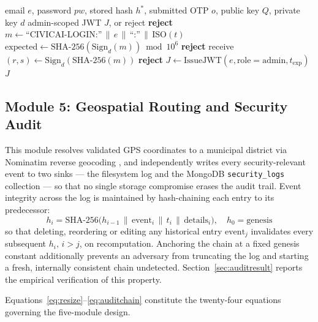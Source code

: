 \documentclass[conference]{IEEEtran}
\begin{document}
\begin{algorithm}[t]
\caption{Three-Factor Administrator Authentication}
\label{alg:auth}
\begin{algorithmic}[1]
\Require email $e$, password $pw$, stored hash $h^{*}$, submitted OTP $o$, public key $Q$, private key $d$
\Ensure admin-scoped JWT $J$, or reject
    \State \textbf{reject} 
\EndIf
\State $m \gets \text{``CIVICAI-LOGIN:''} \,\|\, e \,\|\, \text{``:''} \,\|\, \mathrm{ISO}(t)$
\State $\mathrm{expected} \gets \mathrm{SHA\text{-}256}(\mathrm{Sign}_d(m)) \bmod 10^{6}$ 
    \State \textbf{reject}
\EndIf
\State receive $(r,s) \gets \mathrm{Sign}_d(\mathrm{SHA\text{-}256}(m))$
 
    \State \textbf{reject}
\EndIf
\State $J \gets \mathrm{IssueJWT}(e, \text{role}=\text{admin}, t_{\mathrm{exp}})$ 
\State \Return $J$
\end{algorithmic}
\end{algorithm}

\subsection{Module 5: Geospatial Routing and Security Audit}
This module resolves validated GPS coordinates to a municipal district via Nominatim reverse geocoding \cite{haklay2008osm}, and independently writes every security-relevant event to two sinks --- the filesystem log and the MongoDB \texttt{security\_logs} collection --- so that no single storage compromise erases the audit trail. Event integrity across the log is maintained by hash-chaining each entry to its predecessor:
\begin{equation}
h_i = \mathrm{SHA\text{-}256}\big(h_{i-1} \,\|\, \mathrm{event}_i \,\|\, t_i \,\|\, \mathrm{details}_i\big),\quad h_0 = \mathrm{genesis}
\label{eq:auditchain}
\end{equation}
so that deleting, reordering or editing any historical entry $\mathrm{event}_j$ invalidates every subsequent $h_i,\, i>j$, on recomputation. Anchoring the chain at a fixed genesis constant additionally prevents an adversary from truncating the log and starting a fresh, internally consistent chain undetected. Section~\ref{sec:auditresult} reports the empirical verification of this property.

Equations~\ref{eq:resize}--\ref{eq:auditchain} constitute the twenty-four equations governing the five-module design.
\end{document}
